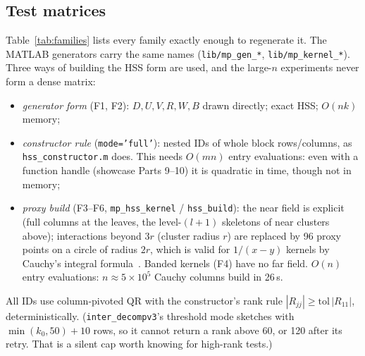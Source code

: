 \subsection{Test matrices}\label{subsec:testmatrices}
Table~\ref{tab:families} lists every family exactly enough to regenerate it. The MATLAB
generators carry the same names (\texttt{lib/mp\_gen\_*}, \texttt{lib/mp\_kernel\_*}).
Three ways of building the HSS form are used, and the large-$n$ experiments never form a dense
matrix:
\begin{itemize}[leftmargin=1.5em,itemsep=1pt]
\item \emph{generator form} (F1, F2): $D,U,V,R,W,B$ drawn directly; exact HSS; $O(nk)$ memory;
\item \emph{constructor rule} (\texttt{mode='full'}): nested IDs of whole block rows/columns, as
\texttt{hss\_constructor.m} does. This needs $O(mn)$ entry evaluations: even with a function
handle (showcase Parts 9--10) it is quadratic in time, though not in memory;
\item \emph{proxy build} (F3--F6, \texttt{mp\_hss\_kernel} / \texttt{hss\_build}): the near field is
explicit (full columns at the leaves, the level-$(l{+}1)$ skeletons of near clusters above);
interactions beyond $3r$ (cluster radius $r$) are replaced by 96 proxy points on a circle of
radius $2r$, which is valid for $1/(x-y)$ kernels by Cauchy's integral formula~\cite{mr}. Banded kernels (F4)
have no far field. $O(n)$ entry evaluations: $n\approx5\times10^5$ Cauchy columns build in 26\,s.
\end{itemize}
All IDs use column-pivoted QR with the constructor's rank rule $|R_{jj}|\ge\mathrm{tol}\,|R_{11}|$,
deterministically. (\texttt{inter\_decompv3}'s threshold mode sketches with $\min(k_0,50)+10$
rows, so it cannot return a rank above 60, or 120 after its retry. That is a silent cap worth
knowing for high-rank tests.)

